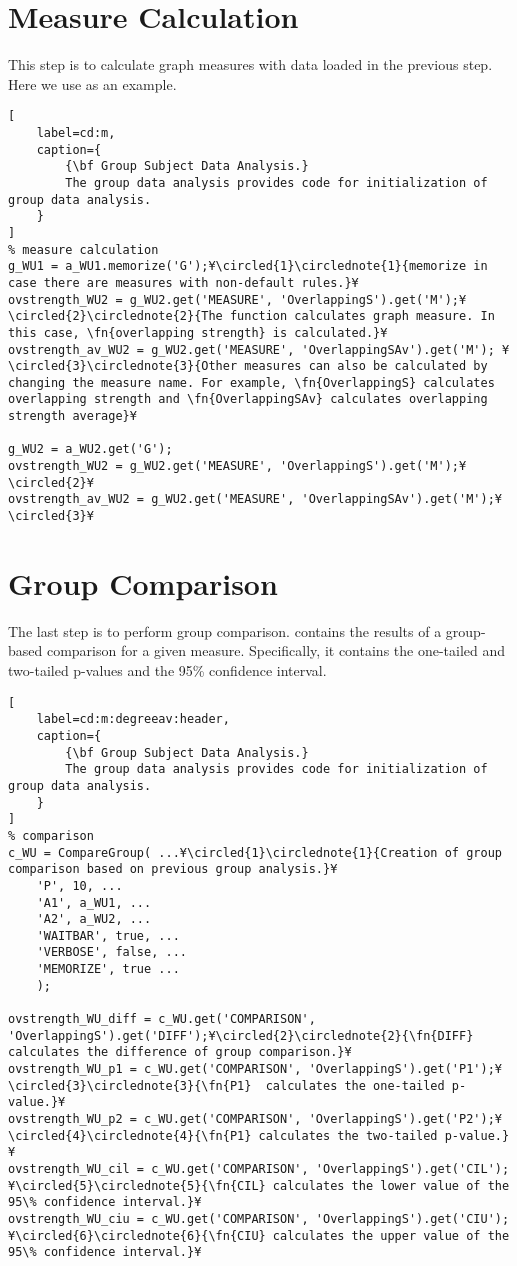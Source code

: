 \documentclass{tufte-handout}
\begin{document}
\section{Measure Calculation}

This step is to calculate graph measures with data loaded in the previous step. Here we use  as an example.

\begin{lstlisting}[
	label=cd:m,
	caption={
		{\bf Group Subject Data Analysis.}
		The group data analysis provides code for initialization of group data analysis.
	}
]
% measure calculation
g_WU1 = a_WU1.memorize('G');¥\circled{1}\circlednote{1}{memorize in case there are measures with non-default rules.}¥
ovstrength_WU2 = g_WU2.get('MEASURE', 'OverlappingS').get('M');¥\circled{2}\circlednote{2}{The function calculates graph measure. In this case, \fn{overlapping strength} is calculated.}¥
ovstrength_av_WU2 = g_WU2.get('MEASURE', 'OverlappingSAv').get('M'); ¥\circled{3}\circlednote{3}{Other measures can also be calculated by changing the measure name. For example, \fn{OverlappingS} calculates overlapping strength and \fn{OverlappingSAv} calculates overlapping strength average}¥

g_WU2 = a_WU2.get('G');
ovstrength_WU2 = g_WU2.get('MEASURE', 'OverlappingS').get('M');¥\circled{2}¥
ovstrength_av_WU2 = g_WU2.get('MEASURE', 'OverlappingSAv').get('M');¥\circled{3}¥
\end{lstlisting}

\section{Group Comparison}

The last step is to perform group comparison.  contains the results of a group-based comparison for a given measure.
Specifically, it contains the one-tailed and two-tailed p-values and the 95\% confidence interval.
\begin{lstlisting}[
	label=cd:m:degreeav:header,
	caption={
		{\bf Group Subject Data Analysis.}
		The group data analysis provides code for initialization of group data analysis.
	}
]
% comparison
c_WU = CompareGroup( ...¥\circled{1}\circlednote{1}{Creation of group comparison based on previous group analysis.}¥
    'P', 10, ...
    'A1', a_WU1, ...
    'A2', a_WU2, ...
    'WAITBAR', true, ...
    'VERBOSE', false, ...
    'MEMORIZE', true ...
    );

ovstrength_WU_diff = c_WU.get('COMPARISON', 'OverlappingS').get('DIFF');¥\circled{2}\circlednote{2}{\fn{DIFF} calculates the difference of group comparison.}¥
ovstrength_WU_p1 = c_WU.get('COMPARISON', 'OverlappingS').get('P1');¥\circled{3}\circlednote{3}{\fn{P1}  calculates the one-tailed p-value.}¥
ovstrength_WU_p2 = c_WU.get('COMPARISON', 'OverlappingS').get('P2');¥\circled{4}\circlednote{4}{\fn{P1} calculates the two-tailed p-value.}¥
ovstrength_WU_cil = c_WU.get('COMPARISON', 'OverlappingS').get('CIL');¥\circled{5}\circlednote{5}{\fn{CIL} calculates the lower value of the 95\% confidence interval.}¥
ovstrength_WU_ciu = c_WU.get('COMPARISON', 'OverlappingS').get('CIU');¥\circled{6}\circlednote{6}{\fn{CIU} calculates the upper value of the 95\% confidence interval.}¥
\end{lstlisting}
\end{document}
